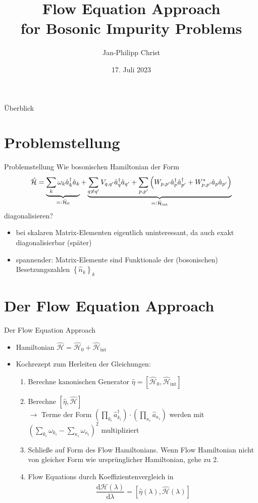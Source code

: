 \documentclass{beamer}
\title{Flow Equation Approach\\ for Bosonic Impurity Problems}
\subtitle{}
\date{17. Juli 2023}
\author{Jan-Philipp Christ}
\institute{LMU München}
\newcommand{\eqdef}{=\vcentcolon}
\newcommand{\CR}{\hat a^\dagger}
\newcommand{\AN}{\hat a}
\newcommand{\ham}{\hat{\mathcal{H}}}
\newcommand{\Sum}{\sum\limits}
\begin{document}
\maketitle

\begin{frame}{Überblick}
\tableofcontents
\end{frame}


\section{Problemstellung}
\begin{frame}{Problemstellung}
Wie bosonischen Hamiltonian der Form
$$
\hat{\mathcal H} = \underbrace{\sum\limits_k\omega_k\hat a_k^\dagger\hat a_k}_{\eqdef \hat{\mathcal H}_0}+\underbrace{\sum\limits_{q\neq q^\prime}V_{q,q^\prime}\hat a_q^\dagger\hat a_{q^\prime}+\sum\limits_{p,p^\prime}\left( W_{p,p^\prime}\hat a_p^\dagger\hat a^\dagger_{p^\prime}+W_{p,p^\prime}^*\hat a_p\hat a_{p^\prime}\right)}_{\eqdef \hat{\mathcal H}_{\mathrm{int}}}
$$ 
diagonalisieren?

\begin{itemize}
\item bei skalaren Matrix-Elementen eigentlich uninteressant, da auch exakt diagonalisierbar (später)
\item spannender: Matrix-Elemente sind Funktionale der (bosonischen) Besetzungszahlen $\left\{\hat n_k \right\}_k$
\end{itemize}
\end{frame}
\section{Der Flow Equation Approach}
\begin{frame}{Der Flow Equation Approach}
\begin{itemize}
\item Hamiltonian $\ham = \ham_0+\ham_{\mathrm{int}}$
\item Kochrezept zum Herleiten der Gleichungen:
\begin{enumerate}
\item Berechne kanonischen Generator $\hat\eta=\left[\ham_0,\ham_{\mathrm{int}}\right]$
\item Berechne $\left[\hat\eta,\ham\right]$ \\
$\rightarrow$ Terme der Form $\left(\prod\limits_{k_i}\CR_{k_i}\right)\cdot\left(\prod\limits_{\kappa_i}\AN_{\kappa_i}\right)$ werden mit $\left(\Sum_{k_i}\omega_{k_i}-\Sum_{\kappa_i}\omega_{\kappa_i}\right)^2$ multipliziert
\item Schließe auf Form des Flow Hamiltonians. Wenn Flow Hamiltonian nicht von gleicher Form wie ursprünglicher Hamiltonian, gehe zu 2.
\item Flow Equations durch Koeffizientenvergleich in $$\frac{\mathrm d\ham(\lambda)}{\mathrm d\lambda} = \left[\hat\eta(\lambda),\ham(\lambda)\right]$$
\end{enumerate}
\end{itemize}
\end{frame}
\end{document}
